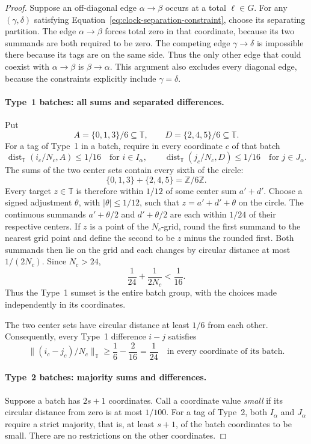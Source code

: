 \begin{proof}
Suppose an off-diagonal edge $\alpha\to\beta$ occurs at a total
$\ell\in G$.  For any $(\gamma,\delta)$ satisfying
Equation~\eqref{eq:clock-separation-constraint}, choose its separating partition.
The edge $\alpha\to\beta$ forces total zero in that coordinate, because
its two summands are both required to be zero.  The competing edge
$\gamma\to\delta$ is impossible there because its tags are on the
same side.  Thus the only other edge that could coexist with
$\alpha\to\beta$ is $\beta\to\alpha$.  This argument also excludes
every diagonal edge, because the constraints explicitly include
$\gamma=\delta$.

\paragraph{Type~1 batches: all sums and separated differences.}
Put
\[
 A=\{0,1,3\}/6\subseteq\mathbb T,
 \qquad D=\{2,4,5\}/6\subseteq\mathbb T.
\]
For a tag of Type~1 in a batch, require in every coordinate $c$ of that
batch
\[
 \operatorname{dist}_{\mathbb T}(i_c/N_c,A)\le1/16
 \quad\text{for }i\in I_\alpha,
 \qquad
 \operatorname{dist}_{\mathbb T}(j_c/N_c,D)\le1/16
 \quad\text{for }j\in J_\alpha.
\]
The sums of the two center sets contain every sixth of the circle:
\[
 \{0,1,3\}+\{2,4,5\}=\mathbb Z/6\mathbb Z.
\]
Every target $z\in\mathbb T$ is therefore within $1/12$ of some center
sum $a'+d'$.  Choose a signed adjustment $\theta$, with
$|\theta|\le1/12$, such that $z=a'+d'+\theta$ on the circle.  The
continuous summands $a'+\theta/2$ and $d'+\theta/2$ are each within
$1/24$ of their respective centers.  If $z$ is a point of the
$N_c$-grid, round the first summand to the nearest grid point and define
the second to be $z$ minus the rounded first.  Both summands then lie
on the grid and each changes by circular distance at most $1/(2N_c)$.
Since $N_c>24$,
\[
 \frac1{24}+\frac1{2N_c}<\frac1{16}.
\]
Thus the Type~1 sumset is the entire batch group, with the choices made
independently in its coordinates.

The two center sets have circular distance at least $1/6$ from each
other.  Consequently, every Type~1 difference $i-j$ satisfies
\begin{equation}
 \|(i_c-j_c)/N_c\|_{\mathbb T}
 \ge \frac16-\frac2{16}=\frac1{24}
 \quad\text{in every coordinate of its batch}.
 \label{eq:clock-type-one-difference}
\end{equation}

\paragraph{Type~2 batches: majority sums and differences.}
Suppose a batch has $2s+1$ coordinates.  Call a coordinate value
\emph{small} if its circular distance from zero is at most $1/100$.
For a tag of Type~2, both $I_\alpha$ and $J_\alpha$ require a strict
majority, that is, at least $s+1$, of the batch coordinates to be small.
There are no restrictions on the other coordinates.


\end{proof}
